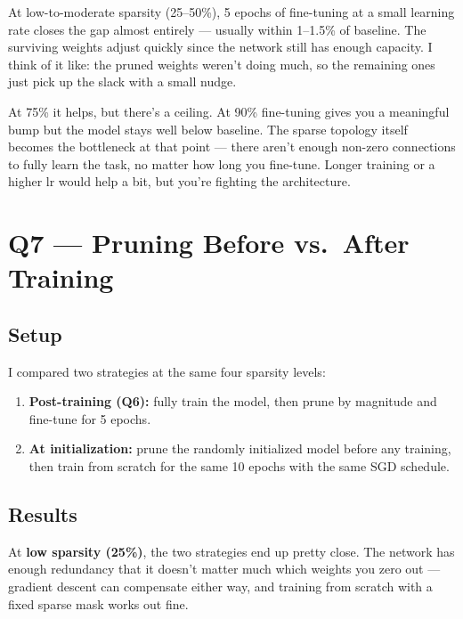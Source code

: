 \documentclass[11pt]{article}
\begin{document}
At low-to-moderate sparsity (25--50\%), 5 epochs of fine-tuning at a small learning rate closes the gap almost entirely --- usually within 1--1.5\% of baseline. The surviving weights adjust quickly since the network still has enough capacity. I think of it like: the pruned weights weren't doing much, so the remaining ones just pick up the slack with a small nudge.

At 75\% it helps, but there's a ceiling. At 90\% fine-tuning gives you a meaningful bump but the model stays well below baseline. The sparse topology itself becomes the bottleneck at that point --- there aren't enough non-zero connections to fully learn the task, no matter how long you fine-tune. Longer training or a higher lr would help a bit, but you're fighting the architecture.

\section{Q7 --- Pruning Before vs.\ After Training}

\subsection{Setup}

I compared two strategies at the same four sparsity levels:

\begin{enumerate}[leftmargin=1.5em]
    \item \textbf{Post-training (Q6):} fully train the model, then prune by magnitude and fine-tune for 5 epochs.
    \item \textbf{At initialization:} prune the randomly initialized model before any training, then train from scratch for the same 10 epochs with the same SGD schedule.
\end{enumerate}

\subsection{Results}

At \textbf{low sparsity (25\%)}, the two strategies end up pretty close. The network has enough redundancy that it doesn't matter much which weights you zero out --- gradient descent can compensate either way, and training from scratch with a fixed sparse mask works out fine.
\end{document}
